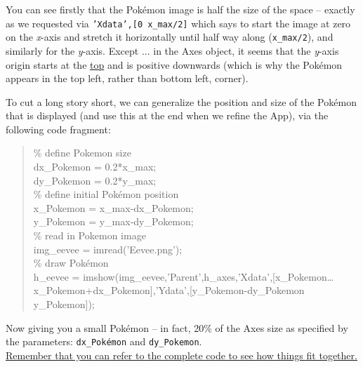 \documentclass{tufte-book} %
\newenvironment{docspec}{\begin{quotation}\ttfamily\parskip0pt\parindent0pt\ignorespaces}{\end{quotation}}
\begin{document}
You can see firstly that the Pok\'emon image is  half the size of the space -- exactly as we requested via \texttt{\textcolor[rgb]{0.501961,0,1}{'Xdata'},[0 x\_max/2]} which says to start the image at zero on the \textit{x}-axis and stretch it horizontally until half way along (\texttt{x\_max/2}), and similarly for the \textit{y}-axis. Except ... in the \textsf{Axes} object, it seems that the \textit{y}-axis origin starts at the \uline{top} and is positive downwards (which is why the Pok\'emon appears in the top left, rather than bottom left, corner).

To cut a long story short, we can generalize the position and size of the Pok\'emon that is displayed (and use this at the end when we refine the App), via the following  code fragment:
\begin{docspec}
\textcolor[rgb]{0,0.501961,0}{\% define Pokemon size}
\\dx\_Pokemon = 0.2*x\_max;
\\dy\_Pokemon = 0.2*y\_max;
\\\textcolor[rgb]{0,0.501961,0}{\% define initial Pok\'emon position}
\\x\_Pokemon = x\_max-dx\_Pokemon;
\\y\_Pokemon = y\_max-dy\_Pokemon;
\\\textcolor[rgb]{0,0.501961,0}{\% read in Pokemon image}
\\img\_eevee = imread(\textcolor[rgb]{0.501961,0,1}{'Eevee.png'});
\\\textcolor[rgb]{0,0.501961,0}{\% draw Pok\'emon}
\\h\_eevee = imshow(img\_eevee,\textcolor[rgb]{0.501961,0,1}{'Parent'},h\_axes,\textcolor[rgb]{0.501961,0,1}{'Xdata'},[x\_Pokemon\ldots
\\ x\_Pokemon+dx\_Pokemon],\textcolor[rgb]{0.501961,0,1}{'Ydata'},[y\_Pokemon-dy\_Pokemon y\_Pokemon]);
\end{docspec}
Now giving you a small Pok\'emon -- in fact, 20\% of the \textsf{Axes} size as specified by the parameters: \texttt{dx\_Pok\'emon} and \texttt{dy\_Pokemon}.
\\\noindent\uline{Remember that you can refer to the complete code to see how things fit together.}
\end{document}
